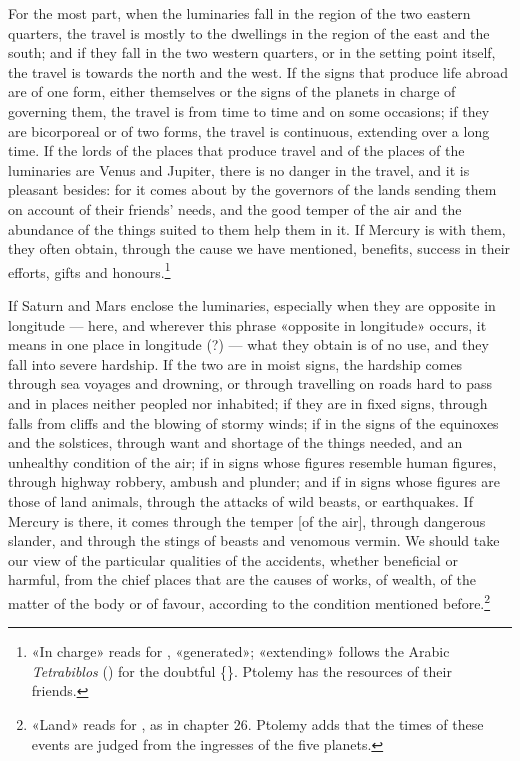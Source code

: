 \documentclass[11pt]{article}
\newcommand{\Fol}[1]{\marginpar{\footnotesize\color{gray}f.\,#1}}
\begin{document}
\par \Fol{73r}For the most part, when the luminaries fall in the region of the two eastern quarters, the travel is mostly to the dwellings in the region of the east and the south; and if they fall in the two western quarters, or in the setting point itself, the travel is towards the north and the west. If the signs that produce life abroad are of one form, either themselves or the signs of the planets in charge of governing them, the travel is from time to time and on some occasions; if they are bicorporeal or of two forms, the travel is continuous, extending over a long time. If the lords of the places that produce travel and of the places of the luminaries are Venus and Jupiter, there is no danger in the travel, and it is pleasant besides: for it comes about by the governors of the lands sending them on account of their friends' needs, and the good temper of the air and the abundance of the things suited to them help them in it. If Mercury is with them, they often obtain, through the cause we have mentioned, benefits, success in their efforts, gifts and honours.\footnote{«In charge» reads  for , «generated»; «extending» follows the Arabic \emph{Tetrabiblos} () for the doubtful \{\}. Ptolemy has the resources of their friends.}\par
\par If Saturn and Mars enclose the luminaries, especially when they are opposite in longitude — here, and wherever this phrase «opposite in longitude» occurs, it means in one place in longitude (?) — what they obtain is of no use, and they fall into severe hardship. If the two are in moist signs, the hardship comes through sea voyages and drowning, or through travelling on roads hard to pass and in places neither peopled nor inhabited; if they are in fixed signs, through falls from cliffs and the blowing of stormy winds; if in the signs of the equinoxes and the solstices, through want and shortage of the things needed, and an unhealthy condition of the air; if in signs whose figures resemble human figures, through highway robbery, ambush and plunder; and if in signs whose figures are those of land animals, through the attacks of wild beasts, or earthquakes. If Mercury is there, it comes through the temper [of the air], through dangerous slander, and through the stings of beasts and venomous vermin. We should take our view of the particular qualities of the accidents, whether beneficial or harmful, from the chief places that are the causes of works, of wealth, of the matter of the body or of favour, according to the condition mentioned before.\footnote{«Land» reads  for , as in chapter 26. Ptolemy adds that the times of these events are judged from the ingresses of the five planets.}\par
\end{document}
